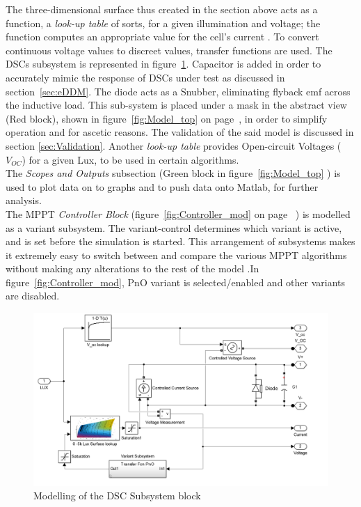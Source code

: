 The three-dimensional surface thus created in the section above acts as a function, a \textit{look-up table} of sorts, for a given illumination and voltage; the function computes an appropriate value for the cell's current . To convert continuous voltage values to discreet values, transfer functions are used. The \ac{DSCs} subsystem is represented in figure~\ref{fig:PV_block_Model}. Capacitor is added in order to accurately mimic the response of \ac{DSCs} under test as discussed in section~\ref{sec:eDDM}. The diode acts as a Snubber, eliminating flyback emf across the inductive load. This sub-system is placed under a mask in the abstract view (Red block), shown in figure~\ref{fig:Model_top} on page~\pageref{fig:Model_top}, in order to simplify operation and for ascetic reasons. The validation of the said model is discussed in section \ref{sec:Validation}. Another \textit{look-up table} provides Open-circuit Voltages ($V_{OC}$) for a given Lux, to be used in certain algorithms. \\

The \textit{Scopes and Outputs} subsection (Green block in figure~\ref{fig:Model_top} ) is used to plot data on to graphs and to push data onto Matlab, for further analysis.\\

The \ac{MPPT} \textit{Controller Block} (figure~\ref{fig:Controller_mod} on page~\pageref{fig:Controller_mod} ) is modelled as a variant subsystem. The variant-control determines which variant is active, and is set before the simulation is started. This arrangement of subsystems makes it extremely easy to switch between and compare the various \ac{MPPT} algorithms without making any alterations to the rest of the model .In figure~\ref{fig:Controller_mod}, \ac{PnO} variant is selected/enabled and other variants are disabled.      

\begin{figure}[H]
	  \begin{center}
		  \includegraphics[width=\textwidth]{images/PV_block_Model}
		  \caption{Modelling of the DSC Subsystem block }
		  \label{fig:PV_block_Model}
	  \end{center}
  \end{figure}
  
